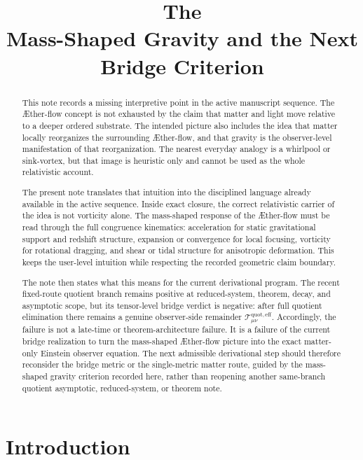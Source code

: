 \documentclass[11pt]{article}
\title{\textbf{The \TheoryName{}}\\[0.4em]
\large Mass-Shaped Gravity and the Next Bridge Criterion}
\author{}
\date{}
\newcommand{\Aflow}{\AE{}ther-flow}
\newcommand{\EffAux}{\mathcal T_{\mu\nu}^{\mathrm{quot,eff}}}
\begin{document}
\maketitle

\begin{abstract}
This note records a missing interpretive point in the active manuscript sequence. The \Aflow{} concept is not exhausted by the claim that matter and light move relative to a deeper ordered substrate. The intended picture also includes the idea that matter locally reorganizes the surrounding \Aflow{}, and that gravity is the observer-level manifestation of that reorganization. The nearest everyday analogy is a whirlpool or sink-vortex, but that image is heuristic only and cannot be used as the whole relativistic account.

The present note translates that intuition into the disciplined language already available in the active sequence. Inside exact closure, the correct relativistic carrier of the idea is not vorticity alone. The mass-shaped response of the \Aflow{} must be read through the full congruence kinematics: acceleration for static gravitational support and redshift structure, expansion or convergence for local focusing, vorticity for rotational dragging, and shear or tidal structure for anisotropic deformation. This keeps the user-level intuition while respecting the recorded geometric claim boundary.

The note then states what this means for the current derivational program. The recent fixed-route quotient branch remains positive at reduced-system, theorem, decay, and asymptotic scope, but its tensor-level bridge verdict is negative: after full quotient elimination there remains a genuine observer-side remainder \(\EffAux\). Accordingly, the failure is not a late-time or theorem-architecture failure. It is a failure of the current bridge realization to turn the mass-shaped \Aflow{} picture into the exact matter-only Einstein observer equation. The next admissible derivational step should therefore reconsider the bridge metric or the single-metric matter route, guided by the mass-shaped gravity criterion recorded here, rather than reopening another same-branch quotient asymptotic, reduced-system, or theorem note.
\end{abstract}

\section{Introduction}
\end{document}
